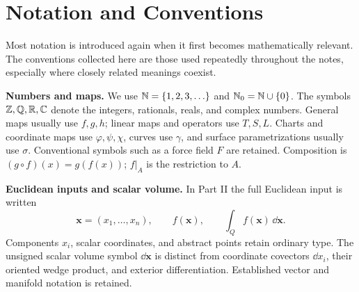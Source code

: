\chapter*{Notation and Conventions}
\begingroup
\small
\setlength{\abovedisplayskip}{6pt}
\setlength{\belowdisplayskip}{6pt}
\setlength{\abovedisplayshortskip}{3pt}
\setlength{\belowdisplayshortskip}{4pt}
\renewcommand{\paragraph}[1]{\par\addvspace{6pt}\noindent\textbf{#1}\enspace}
Most notation is introduced again when it first becomes mathematically
relevant. The conventions collected here are those used repeatedly
throughout the notes, especially where closely related meanings coexist.

\paragraph{Numbers and maps.}
We use $\mathbb{N}=\{1,2,3,\ldots\}$ and $\mathbb{N}_0=\mathbb{N}\cup\{0\}$.
The symbols $\mathbb{Z},\mathbb{Q},\mathbb{R},\mathbb{C}$ denote the integers, rationals, reals, and
complex numbers. General maps usually use $f,g,h$; linear maps and
operators use $T,S,L$. Charts and coordinate maps use $\varphi,\psi,\chi$,
curves use $\gamma$, and surface parametrizations usually use $\sigma$.
Conventional symbols such as a force field $F$ are retained.
Composition is $(g\circ f)(x)=g(f(x))$; $f|_A$ is the
restriction to $A$.

\paragraph{Euclidean inputs and scalar volume.}
In Part II the full Euclidean input is written
\[
\mathbf{x}=(x_1,\ldots,x_n),\qquad f(\mathbf{x}),\qquad
\int_Qf(\mathbf{x})\,\dd\mathbf{x}.
\]
Components $x_i$, scalar coordinates, and abstract points retain ordinary
type. The unsigned scalar volume symbol $\dd\mathbf{x}$ is distinct from
coordinate covectors $\dd x_i$, their oriented wedge product, and exterior
differentiation. Established vector and manifold notation is retained.

